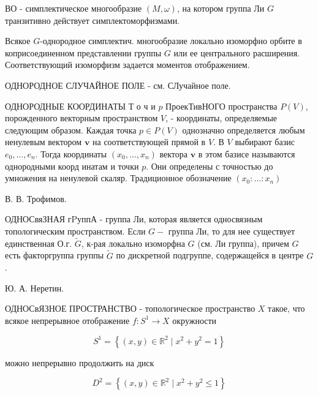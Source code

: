 \documentclass[10pt]{article}
\begin{document}
ВО - симплектическое многообразие $(M, \omega)$, на котором группа Ли $G$ транзитивно действует симплектоморфизмами.



Всякое $G$-однородное симплектич. многообразие локально изоморфно орбите в коприсоединенном представлении группы $G$ или ее центрального расширения. Соответствующий изоморфизм задается моментов отображением.



ОДНОРОДНОЕ СЛУЧАЙНОЕ ПОЛЕ - см. СЛучайное поле.



ОДНОРОДНЫЕ КООРДИНАТЫ Т о ч и $p$ ПроекТивНОГО пространства $P(V)$, порожденного векторным пространством $V$, - координаты, определяемые следующим образом. Каждая точка $p \in P(V)$ однозначно определяется любым ненулевым вектором $\boldsymbol{v}$ на соответствующей прямой в $V$. В $V$ выбирают базис $e_{0}, \ldots, e_{n}$. Тогда координаты $\left(x_{0}, \ldots, x_{n}\right)$ вектора $\boldsymbol{v}$ в этом базисе называются однородными коорд инатам и точки $p$. Они определены с точностью до умножения на ненулевой скаляр. Традиционное обозначение $\left(x_{0}: \ldots: x_{n}\right)$



В. В. Трофимов.



ОДНОСвяЗНАЯ гPуппА - группа Ли, которая является односвязным топологическим пространством. Если $G-$ группа Ли, то для нее существует единственная О.г. $\widetilde{G}$, к-рая локально изоморфна $G$ (см. Ли группа), причем $G$ есть факторгруппа группы $\widetilde{G}$ по дискретной подгруппе, содержащейся в центре $G$.



Ю. А. Неретин.



ОДНОСвЯЗНОЕ ПРОСТРАНСТВО - топологическое пространство $X$ такое, что всякое непрерывное отображение $f: S^{1} \rightarrow X$ окружности



\[

S^{1}=\left\{(x, y) \in \mathbb{R}^{2} \mid x^{2}+y^{2}=1\right\}

\]



можно непрерывно продолжить на диск



\[

D^{2}=\left\{(x, y) \in \mathbb{R}^{2} \mid x^{2}+y^{2} \leqslant 1\right\}

\]
\end{document}
